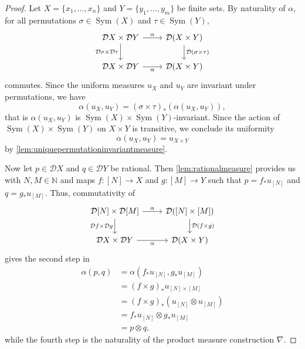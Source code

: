 \documentclass[11pt,a4paper]{scrartcl}
\newcommand{\N}{\mathbb{N}}
\newcommand{\finiteset}[1]{[#1]}	%
\newcommand{\dist}{\mathcal{D}}
\theoremstyle{definition}
\begin{document}
\begin{proof}
  Let $X = \{x_1,\ldots,x_n\}$ and $Y = \{y_1,\ldots,y_m\}$ be finite sets. By naturality of $\alpha$, for all permutations $\sigma \in \operatorname{Sym}(X)$ and $\tau \in \operatorname{Sym}(Y)$,
  \[
    \begin{tikzcd}
      \dist X \times \dist Y \arrow[r, "{\alpha}"] \arrow[d, "\dist\sigma \times \dist\tau"'] & \dist(X\times Y) \arrow[d, "\dist(\sigma \times \tau)"] \\
      \dist X \times \dist Y \arrow[r, "{\alpha}"']                                   & \dist(X \times Y)
    \end{tikzcd}
  \]
  commutes.
  Since the uniform measures $u_X$ and $u_Y$ are invariant under permutations, we have
  \[
    \alpha(u_X,u_Y) = (\sigma \times \tau)_\ast (\alpha(u_X,u_Y)),
  \]
  that is $\alpha(u_X,u_Y)$ is $\operatorname{Sym}(X) \times \operatorname{Sym}(Y)$-invariant. Since the action of $\operatorname{Sym}(X) \times \operatorname{Sym}(Y)$ on $X \times Y$ is transitive, we conclude its uniformity
  \[
	  \alpha(u_X,u_Y) = u_{X \times Y}
  \]
  by \cref{lem:uniquepermutationinvariantmeasure}.

  Now let $p \in \dist X$ and $q \in \dist Y$ be rational.
  Then \cref{lem:rationalmeasure} provides us with $N,M \in \N$ and maps $f:\finiteset{N} \rightarrow X$ and $g:\finiteset{M} \rightarrow Y$ such that $p = f_\ast u_{\finiteset{N}}$ and $q = g_\ast u_{\finiteset{M}}$. 
  Thus, commutativity of
  \[
    \begin{tikzcd}
      \dist \finiteset{N} \times \dist \finiteset{M} \arrow[r, "{\alpha}"] \arrow[d, "\dist f \times \dist g"'] & \dist(\finiteset{N} \times \finiteset{M}) \arrow[d, "\dist(f \times g)"] \\
      \dist X \times \dist Y \arrow[r, "{\alpha}"']                               & \dist(X \times Y)
    \end{tikzcd}
  \]
  gives the second step in
  \begin{align*}
	  \alpha(p,q) & = \alpha(f_\ast u_{\finiteset{N}},g_\ast u_{\finiteset{M}}) \\[2pt]
			    & = (f \times g)_\ast u_{\finiteset{N} \times \finiteset{M}} \\[2pt]
			    & = (f \times g)_\ast (u_{\finiteset{N}} \otimes u_{\finiteset{M}}) \\[2pt]
			    & = f_\ast u_{\finiteset{N}} \otimes g_\ast u_{\finiteset{M}} \\[2pt]
			    & = p \otimes q,
  \end{align*}
  while the fourth step is the naturality of the product measure construction $\nabla$.
\end{proof}
\end{document}
